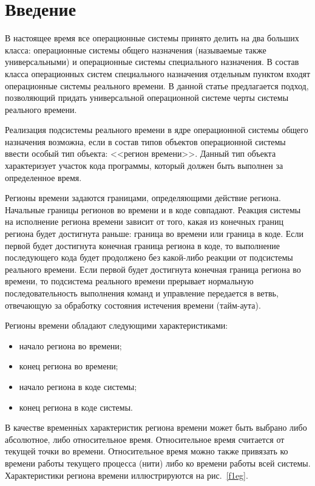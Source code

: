       \begin{multicols}{2}

      \label{st\stat}

\section{Введение}

     В настоящее время все операционные сис\-те\-мы принято делить на два больших класса:
операционные системы общего назначения (называемые также универсальными) и 
операционные %
сис\-те\-мы специ\-аль\-но\-го назначения. В состав класса 
операционных сис\-тем специального назначения отдельным пунктом входят 
операционные системы реального времени. В данной статье предлагается подход, 
позволяющий придать универсальной операционной системе черты системы реального 
времени.

   Реализация подсистемы реального времени в ядре операционной системы общего назначения
возможна, если в состав типов объектов операционной системы ввести особый тип объекта:
<<регион времени>>. Данный тип объекта характеризует учас\-ток кода программы, который
должен быть выполнен за определенное время.

   Регионы времени задаются границами, определяющими действие региона. Начальные границы
регионов во времени и в коде совпадают. Реакция системы на исполнение региона времени
зависит от того, какая из конечных границ региона будет достигнута раньше: граница во времени
или граница в коде. Если первой будет достигнута конечная граница региона в коде, то
выполнение последующего кода будет продолжено без какой-либо реакции от подсистемы
реального времени. Если первой будет достигнута конечная граница региона во времени, то
подсистема реального времени прерывает нормальную последовательность выполнения команд и
управление передается в ветвь, отвечающую за обработку состояния истечения времени
   (тайм-аута).

   Регионы времени обладают следующими характеристиками:
   \begin{itemize}
\item начало региона во времени;
\item конец региона во времени;
\item начало региона в коде системы;
\item конец региона в коде системы.
   \end{itemize}

   В качестве временн$\acute{\mbox{ы}}$х характеристик региона времени может быть выбрано либо абсолютное,
либо относительное время. Относительное время считается от текущей точки во времени.
Относительное время можно также привязать ко времени работы текущего процесса (нити) либо
ко времени работы всей системы. Характеристики региона времени иллюстрируются на
рис.~\ref{f1eg}.


\end{multicols}
